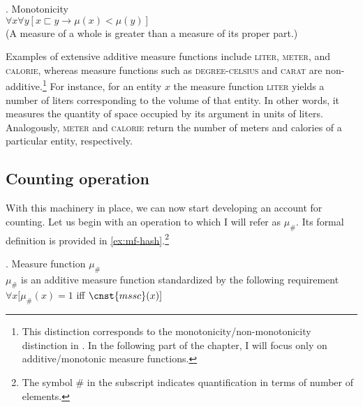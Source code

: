 	\ex. Monotonicity\\
	$\forall x\forall y[x \sqsubset y \rightarrow \mu(x) < \mu(y)]$\\
	(A measure of a whole is greater than a measure of its proper part.)\label{ex:mf-monotonicity}
	
	Examples of extensive additive measure functions include \textsc{liter}, \textsc{meter}, and \textsc{calorie}, whereas measure functions such as \textsc{degree-celsius} and \textsc{carat} are non-additive.\footnote{This distinction corresponds to the monotonicity/non-monotonicity distinction in \citet{schwarzschild2002grammar}. In the following part of the chapter, I will focus only on additive/monotonic measure functions.} For instance, for an entity $x$ the measure function \textsc{liter} yields a number of liters corresponding to the volume of that entity. In other words, it measures the quantity of space occupied by its argument in units of liters. Analogously, \textsc{meter} and \textsc{calorie} return the number of meters and calories of a particular entity, respectively. 
	
	\subsection{Counting operation}\label{sec:counting-operation}
	
	With this machinery in place, we can now start developing an account for counting. Let us begin with an operation to which I will refer as $\mu_\#$. Its formal definition is provided in \ref{ex:mf-hash}.\footnote{The symbol $\#$ in the subscript indicates quantification in terms of number of elements.} 
	
	\ex. Measure function $\mu_\#$\\
	$\mu_\#$ is an additive measure function standardized by the following requirement\\
	$\forall x[\mu_\#(x) = 1$ iff $\cnst{mssc}(x)]$\label{ex:mf-hash}
	
